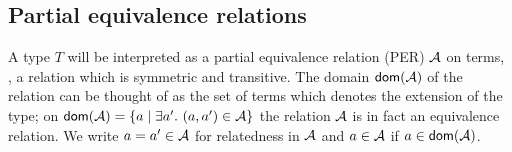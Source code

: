\documentclass[acmsmall,screen]{acmart}\settopmatter{}
\begin{document}



\subsection{Partial equivalence relations}
\label{sec:per}

A type $T$ will be interpreted as a partial equivalence relation (PER)
$\mathcal{A}$ on terms, \ie, a relation which is symmetric and transitive. The
domain $\mathop{\mathsf{dom}}\nolimits(\mathcal{A})$ of the relation can be thought of as the set of
terms which denotes the extension of the type; on
$\mathop{\mathsf{dom}}\nolimits(\mathcal{A}) = \{a \mid \exists a'.\ (a,a') \in \mathcal{A} \}$ the relation $\mathcal{A}$
is in fact an equivalence relation.  We write $a = a' \in \mathcal{A}$ for
relatedness in $\mathcal{A}$ and $a \in \mathcal{A}$ if $a \in \mathop{\mathsf{dom}}\nolimits(\mathcal{A})$.
\end{document}
